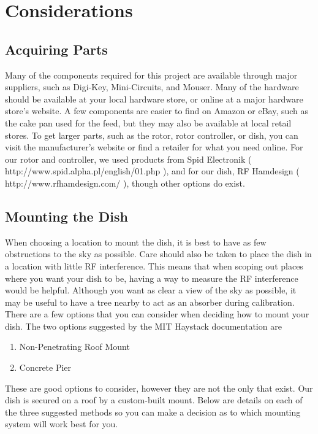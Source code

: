 \documentclass[11pt]{article} %
\begin{document}
\section{Considerations}

\subsection{Acquiring Parts}

Many of the components required for this project are available through major suppliers, such as Digi-Key, Mini-Circuits, and Mouser. Many of the hardware should be available at your local hardware store, or online at a major hardware store's website. A few components are easier to find on Amazon or eBay, such as the cake pan used for the feed, but they may also be available at local retail stores. To get larger parts, such as the rotor, rotor controller, or dish, you can visit the manufacturer's website or find a retailer for what you need online. For our rotor and controller, we used products from Spid Electronik ( http://www.spid.alpha.pl/english/01.php ), and for our dish, RF Hamdesign ( http://www.rfhamdesign.com/ ), though other options do exist.


\subsection{Mounting the Dish}

When choosing a location to mount the dish, it is best to have as few obstructions to the sky as possible. Care should also be taken to place the dish in a location with little RF interference. This means that when scoping out places where you want your dish to be, having a way to measure the RF interference would be helpful. Although you want as clear a view of the sky as possible, it may be useful to have a tree nearby to act as an absorber during calibration. \\
There are a few options that you can consider when deciding how to mount your dish. The two options suggested by the MIT Haystack documentation are

\begin{enumerate}
\item Non-Penetrating Roof Mount
\item Concrete Pier
\end{enumerate}

These are good options to consider, however they are not the only that exist. Our dish is secured on a roof by a custom-built mount. Below are details on each of the three suggested methods so you can make a decision as to which mounting system will work best for you.
\end{document}
